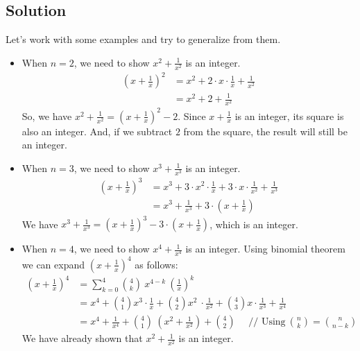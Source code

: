 \documentclass[12pt]{article}
\begin{document}
\subsection*{Solution}
Let's work with some examples and try to generalize from them.
\begin{itemize}
\item When $n=2$, we need to show $x^2 + \frac{1}{x^2}$ is an integer.
\begin{equation*}
	\begin{aligned}
		\left(x + \frac{1}{x}\right)^2 &= x^2 + 2 \cdot x \cdot \frac{1}{x} + \frac{1}{x^2}\\
		&= x^2+2+\frac{1}{x^2}
	\end{aligned}
\end{equation*}
So, we have $x^2+\frac{1}{x^2} = \left(x + \frac{1}{x}\right)^2-2$. Since $x + \frac{1}{x}$ is an integer, its square is also an integer. And, if we subtract $2$ from the square, the result will still be an integer.

\item When $n=3$, we need to show $x^3 + \frac{1}{x^3}$ is an integer.
\begin{equation*}
	\begin{aligned}
		\left(x + \frac{1}{x}\right)^3 &= x^3 + 3 \cdot x^2 \cdot \frac{1}{x} + 3 \cdot x \cdot \frac{1}{x^2} + \frac{1}{x^3}\\
		&= x^3+\frac{1}{x^3} + 3\cdot \left( x + \frac{1}{x} \right)
	\end{aligned}
\end{equation*}
We have $x^3 + \frac{1}{x^3} = \left(x + \frac{1}{x}\right)^3-3\cdot \left( x + \frac{1}{x} \right)$, which is an integer.

\item When $n=4$, we need to show $x^4 + \frac{1}{x^4}$ is an integer. Using binomial theorem we can expand $\left(x + \frac{1}{x}\right)^4$ as follows:
\begin{equation*}
	\begin{aligned}
		\left(x + \frac{1}{x}\right)^4 &= \sum_{k=0}^{4} \binom{4}{k}\ x^{4-k}\ \left( \frac{1}{x} \right)^k\\
		&= x^4 + \binom{4}{1}x^3 \cdot \frac{1}{x} + \binom{4}{2}x^2\ \cdot \frac{1}{x^2} + \binom{4}{3}x \cdot \frac{1}{x^3} + \frac{1}{x^4}\\
		&= x^4 + \frac{1}{x^4} + \binom{4}{1}\ \left( x^2 + \frac{1}{x^2} \right) + \binom{4}{2}\ \ \ \ \ \ \textrm{// Using}\ \binom{n}{k} = \binom{n}{n-k}
	\end{aligned}
\end{equation*}
We have already shown that $x^2+\frac{1}{x^2}$ is an integer. 


\end{itemize}
\end{document}
